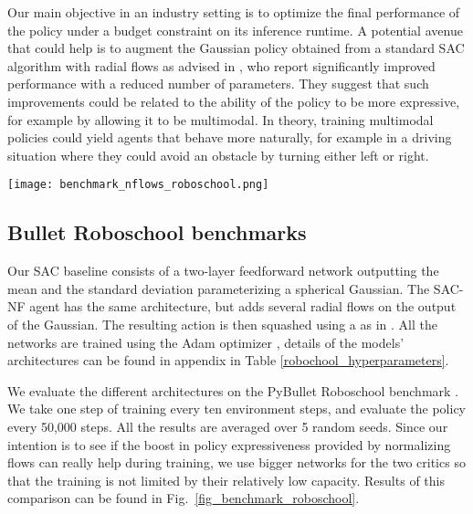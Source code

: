 \documentclass[letterpaper]{article} \usepackage{aaai20}  \usepackage{times}  \usepackage{helvet} \usepackage{courier}  \usepackage[hyphens]{url}  \usepackage{graphicx} \urlstyle{rm} \def\UrlFont{\rm}  \usepackage{graphicx}  \usepackage[section]{placeins}
\begin{document}
Our main objective in an industry setting is to optimize the final performance of the policy under a budget constraint on its inference runtime. A potential avenue that could help is to augment the Gaussian policy obtained from a standard SAC algorithm with radial flows as advised in \cite{mazoure2019leveraging}, who report significantly improved performance with a reduced number of parameters. They suggest that such improvements could be related to the ability of the policy to be more expressive, for example by allowing it to be multimodal. In theory, training multimodal policies could yield agents that behave more naturally, for example in a driving situation where they could avoid an obstacle by turning either left or right.

\begin{figure*}[h]
\centering
\texttt{[image: benchmark\_nflows\_roboschool.png]} \caption{Comparison of the performance of SAC with and without radial normalizing flows on three Roboschool PyBullet environments. Curves are averaged on 5 random seeds, and smoothed using Savitzky-Golay filtering with window size 7.}
\label{fig_benchmark_roboschool}
\end{figure*}

\subsection{Bullet Roboschool benchmarks}

Our SAC baseline consists of a two-layer feedforward network outputting the mean and the standard deviation parameterizing a spherical Gaussian. The SAC-NF agent has the same architecture, but adds several radial flows on the output of the Gaussian. The resulting action is then squashed using a  as in \cite{haarnoja2018soft}. All the networks are trained using the Adam optimizer \cite{kingma2014adam}, details of the models' architectures can be found in appendix in Table \ref{robochool_hyperparameters}.

We evaluate the different architectures on the PyBullet Roboschool benchmark \cite{coumans2016pybullet}. We take one step of training every ten environment steps, and evaluate the policy every 50,000 steps. All the results are averaged over 5 random seeds. Since our intention is to see if the boost in policy expressiveness provided by normalizing flows can really help during training, we use bigger networks for the two critics so that the training is not limited by their relatively low capacity. Results of this comparison can be found in Fig.~\ref{fig_benchmark_roboschool}. 
\end{document}
